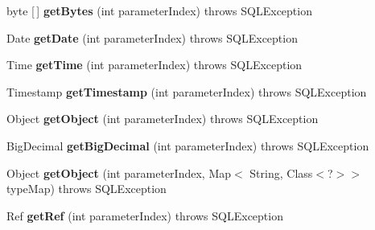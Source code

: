 \begin{DoxyCompactItemize}
byte \mbox{[}$\,$\mbox{]} {\bfseries get\+Bytes} (int parameter\+Index)  throws S\+Q\+L\+Exception 
\item 
\mbox{\label{classcom_1_1mysql_1_1cj_1_1jdbc_1_1_callable_statement_wrapper_ad72f6af2c2145a0b711e39c35d8de37a}} 
Date {\bfseries get\+Date} (int parameter\+Index)  throws S\+Q\+L\+Exception 
\item 
\mbox{\label{classcom_1_1mysql_1_1cj_1_1jdbc_1_1_callable_statement_wrapper_ac6ae348f75727284f4ee244e731109fb}} 
Time {\bfseries get\+Time} (int parameter\+Index)  throws S\+Q\+L\+Exception 
\item 
\mbox{\label{classcom_1_1mysql_1_1cj_1_1jdbc_1_1_callable_statement_wrapper_a4c42eb1a7e9d3d711ebbfab24783ba54}} 
Timestamp {\bfseries get\+Timestamp} (int parameter\+Index)  throws S\+Q\+L\+Exception 
\item 
\mbox{\label{classcom_1_1mysql_1_1cj_1_1jdbc_1_1_callable_statement_wrapper_a1559252d0b3ea2b04ca1b6cbba5cd022}} 
Object {\bfseries get\+Object} (int parameter\+Index)  throws S\+Q\+L\+Exception 
\item 
\mbox{\label{classcom_1_1mysql_1_1cj_1_1jdbc_1_1_callable_statement_wrapper_a008af4c155c1e7a47eafaf9c10f6488c}} 
Big\+Decimal {\bfseries get\+Big\+Decimal} (int parameter\+Index)  throws S\+Q\+L\+Exception 
\item 
\mbox{\label{classcom_1_1mysql_1_1cj_1_1jdbc_1_1_callable_statement_wrapper_a878edbe5b4d6d8a93cbe01e2072f0cd3}} 
Object {\bfseries get\+Object} (int parameter\+Index, Map$<$ String, Class$<$?$>$$>$ type\+Map)  throws S\+Q\+L\+Exception 
\item 
\mbox{\label{classcom_1_1mysql_1_1cj_1_1jdbc_1_1_callable_statement_wrapper_abbd6aeb5202c2b47ce1d7e7744412225}} 
Ref {\bfseries get\+Ref} (int parameter\+Index)  throws S\+Q\+L\+Exception 
$$
\end{DoxyCompactItemize}
